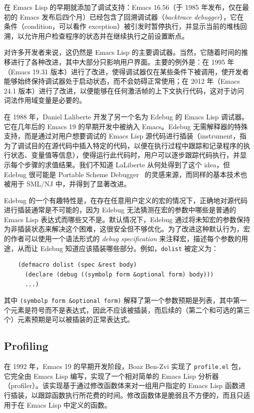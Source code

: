 \documentclass[format=acmsmall,screen]{acmart}
\begin{document}
在 Emacs Lisp 的早期就添加了调试支持：Emacs 16.56（于 1985 年发布，仅在最初的 Emacs 发布后四个月）已经包含了回溯调试器（\emph{backtrace debugger}），它在条件（condition，可以看作 exception）被引发时暂停执行，并显示当前的堆栈回溯，以允许用户检查程序的状态并在继续执行之前设置断点。

对许多开发者来说，这仍然是 Emacs Lisp 的主要调试器。当然，它随着时间的推移进行了各种改进，其中大部分只影响用户界面。主要的例外是：在 1995 年（Emacs 19.31 版本）进行了改进，使得调试器仅在某些条件下被调用，使开发者能够始终保持调试器处于启动状态，而不会妨碍正常使用；在 2012 年（Emacs 24.1 版本）进行了改进，以便能够在任何激活帧的上下文执行代码，这对于访问词法作用域变量是必要的。

在 1988 年，Daniel Laliberte 开发了另一个名为 Edebug 的 Emacs Lisp 调试器。它在几年后的 Emacs 19 的早期开发中被纳入 Emacs。Edebug 无需解释器的特殊支持，而是通过对用户想要调试的 Emacs Lisp 源代码进行插装（instrument，指为了调试目的在源代码中插入特定的代码，以便在执行过程中跟踪和记录程序的执行状态、变量值等信息），使得运行此代码时，用户可以逐步跟踪代码执行，并显示每个步骤的求值结果。我们不知道 LaLiberte 从何处得到了这个 idea，但 Edebug 很可能是 Portable Scheme Debugger~\cite{Kellomaki93} 的灵感来源，而同样的基本技术也被用于 SML/NJ\cite{Tolmach90} 中，并得到了显著改进。

Edebug 的一个有趣特性是，在存在任意用户定义的宏的情况下，正确地对源代码进行插装通常是不可能的，因为 Edebug 无法猜测在宏的参数中哪些是普通的 Emacs Lisp 表达式而哪些又不是。默认情况下，Edebug 通过将未知宏的参数保持为非插装状态来解决这个困难，这很安全但不够优化。为了改进这种默认行为，宏的作者可以使用一个语法形式的 \emph{debug specification} 来注释宏，描述每个参数的用途，从而让 Edebug 知道应该插装哪些部分。例如，\texttt{dolist} 被定义为：

\begin{verbatim}
    (defmacro dolist (spec &rest body)
      (declare (debug ((symbolp form &optional form) body)))
      ...)
\end{verbatim}

其中 \texttt{(symbolp form \&optional form)} 解释了第一个参数预期是列表，其中第一个元素是符号而不是表达式，因此不应该被插装，而后续的（第二个和可选的第三个）元素预期是可以被插装的正常表达式。

\subsection{Profiling}
\label{sec:profiler}

在 1992 年，Emacs 19 的早期开发阶段，Boaz Ben-Zvi 实现了 \texttt{profile.el} 包，它完全由 Emacs Lisp 编写，实现了一个相对简单的 Emacs Lisp 分析器（profiler）。该实现基于通过修改函数体来对一组用户指定的 Emacs Lisp 函数进行插装，以跟踪函数执行所花费的时间。修改函数体是脆弱且不方便的，而且只适用于在 Emacs Lisp 中定义的函数。
\end{document}

